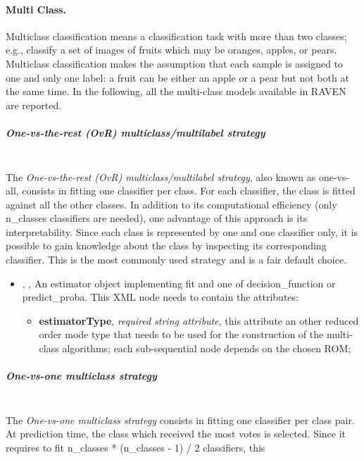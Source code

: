 \paragraph{Multi Class.}
\label{Multiclass}
Multiclass classification means a classification task with more than two
classes; e.g., classify a set of images of fruits which may be oranges, apples,
or pears.
%
Multiclass classification makes the assumption that each sample is assigned to
one and only one label: a fruit can be either an apple or a pear but not both at
the same time.
%
In the following, all the multi-class models available in RAVEN are reported.
%
\subparagraph{One-vs-the-rest (OvR) multiclass/multilabel strategy}
\mbox{}
\\The \textit{One-vs-the-rest (OvR) multiclass/multilabel strategy}, also known
as one-vs-all, consists in fitting one classifier per class.
%
For each classifier, the class is fitted against all the other classes.
%
In addition to its computational efficiency (only n\_classes classifiers are
needed), one advantage of this approach is its interpretability.
%
Since each class is represented by one and one classifier only, it is possible
to gain knowledge about the class by inspecting its corresponding classifier.
%
This is the most commonly used strategy and is a fair default choice.
%
\begin{itemize}
  \item {} , ,
  An estimator object implementing fit and one of decision\_function or
  predict\_proba.
  This XML node needs to contain the attributes:
  \vspace{-5mm}
  \begin{itemize}
    \itemsep0em
    \item \textbf{estimatorType}, \textit{required string attribute}, this
    attribute an other reduced order mode type that needs to be used for the
    construction of the multi-class algorithms; each sub-sequential node depends
    on the chosen ROM;
  \end{itemize}
\end{itemize}
\subparagraph{One-vs-one multiclass strategy}
\mbox{}
\\The \textit{One-vs-one multiclass strategy} consists in fitting one classifier
per class pair.
%
At prediction time, the class which received the most votes is selected.
%
Since it requires to fit n\_classes * (n\_classes - 1) / 2 classifiers, this
